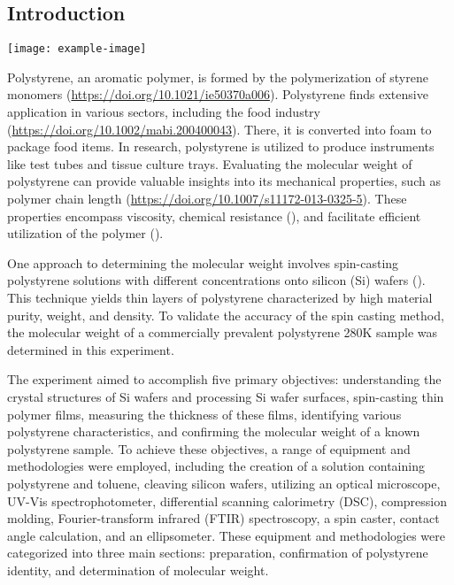 \documentclass{article}
\newenvironment{Figure}
  {\par\medskip\noindent\minipage{\linewidth}}
  {\endminipage\par\medskip}
\begin{document}
    \begin{multicols}{2}
        \section{Introduction}
        \begin{Figure}
            \centering
            \texttt{[image: example-image]}
        \end{Figure}
        Polystyrene, an aromatic polymer, is formed by the polymerization of styrene monomers (\url{https://doi.org/10.1021/ie50370a006}). Polystyrene finds extensive application in various sectors, including the food industry (\url{https://doi.org/10.1002/mabi.200400043}). There, it is converted into foam to package food items. In research, polystyrene is utilized to produce instruments like test tubes and tissue culture trays. Evaluating the molecular weight of polystyrene can provide valuable insights into its mechanical properties, such as polymer chain length (\url{https://doi.org/10.1007/s11172-013-0325-5}). These properties encompass viscosity, chemical resistance (), and facilitate efficient utilization of the polymer ().

        One approach to determining the molecular weight involves spin-casting polystyrene solutions with different concentrations onto silicon (Si) wafers (). This technique yields thin layers of polystyrene characterized by high material purity, weight, and density\cite{WOS:A1994PN08400004}. To validate the accuracy of the spin casting method, the molecular weight of a commercially prevalent polystyrene 280K sample was determined in this experiment.

        The experiment aimed to accomplish five primary objectives: understanding the crystal structures of Si wafers and processing Si wafer surfaces, spin-casting thin polymer films, measuring the thickness of these films, identifying various polystyrene characteristics, and confirming the molecular weight of a known polystyrene sample. To achieve these objectives, a range of equipment and methodologies were employed, including the creation of a solution containing polystyrene and toluene, cleaving silicon wafers, utilizing an optical microscope, UV-Vis spectrophotometer, differential scanning calorimetry (DSC), compression molding, Fourier-transform infrared (FTIR) spectroscopy, a spin caster, contact angle calculation, and an ellipsometer. These equipment and methodologies were categorized into three main sections: preparation, confirmation of polystyrene identity, and determination of molecular weight.


\end{multicols}
\end{document}
